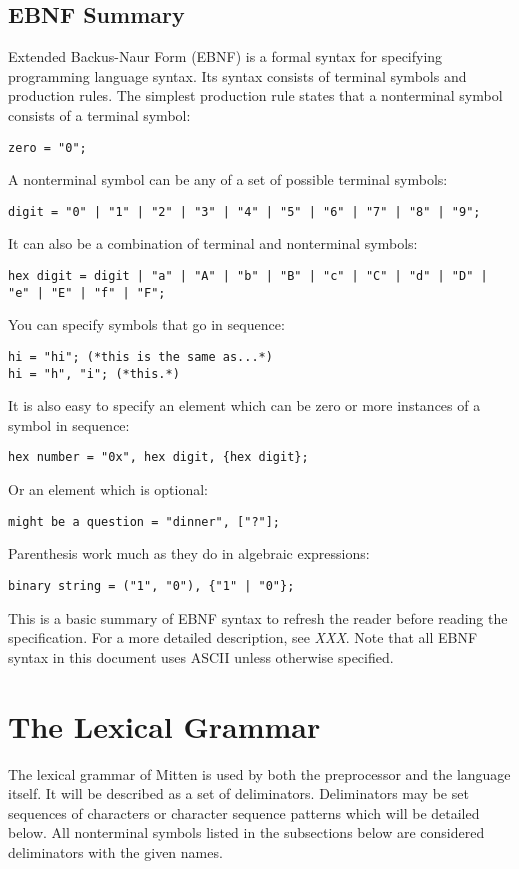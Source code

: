 \documentclass[10pt,a4paper]{article}
\begin{document}
\subsection{EBNF Summary}
\label{sec:EBNFSummary}
Extended Backus-Naur Form (EBNF) is a formal syntax for specifying programming language syntax. Its syntax consists of terminal symbols and production rules. The simplest production rule states that a nonterminal symbol consists of a terminal symbol:
\begin{verbatim}
zero = "0";
\end{verbatim}

A nonterminal symbol can be any of a set of possible terminal symbols:
\begin{verbatim}
digit = "0" | "1" | "2" | "3" | "4" | "5" | "6" | "7" | "8" | "9";
\end{verbatim}

It can also be a combination of terminal and nonterminal symbols:
\begin{verbatim}
hex digit = digit | "a" | "A" | "b" | "B" | "c" | "C" | "d" | "D" | "e" | "E" | "f" | "F";
\end{verbatim}

You can specify symbols that go in sequence:
\begin{verbatim}
hi = "hi"; (*this is the same as...*)
hi = "h", "i"; (*this.*)
\end{verbatim}

It is also easy to specify an element which can be zero or more instances of a symbol in sequence:
\begin{verbatim}
hex number = "0x", hex digit, {hex digit};
\end{verbatim}

Or an element which is optional:
\begin{verbatim}
might be a question = "dinner", ["?"];
\end{verbatim}

Parenthesis work much as they do in algebraic expressions:
\begin{verbatim}
binary string = ("1", "0"), {"1" | "0"};
\end{verbatim}

This is a basic summary of EBNF syntax to refresh the reader before reading the specification. For a more detailed description, see \textit{XXX}. Note that all EBNF syntax in this document uses ASCII unless otherwise specified.

\section{The Lexical Grammar}
The lexical grammar of Mitten is used by both the preprocessor and the language itself. It will be described as a set of deliminators. Deliminators may be set sequences of characters or character sequence patterns which will be detailed below. All nonterminal symbols listed in the subsections below are considered deliminators with the given names.
\end{document}
